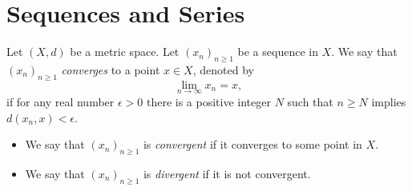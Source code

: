 \chapter{Sequences and Series}
\begin{definition}
  Let $(X, d)$ be a metric space.
  Let $(x_n)_{n \geq 1}$ be a sequence in $X$.
  We say that $(x_n)_{n \geq 1}$ \emph{converges} to a point $x \in X$, denoted
  by
  \begin{equation*}
    \lim_{n \to \infty} x_n = x,
  \end{equation*}
  if for any real number $\epsilon > 0$ there is a positive integer $N$
  such that $n \geq N$ implies $d(x_n, x) < \epsilon$.
  \begin{itemize}
    \item We say that $(x_n)_{n \geq 1}$ is \emph{convergent} if it converges
    to some point in $X$.
    \item We say that $(x_n)_{n \geq 1}$ is \emph{divergent} if it is not
    convergent.
  \end{itemize}
\end{definition}
